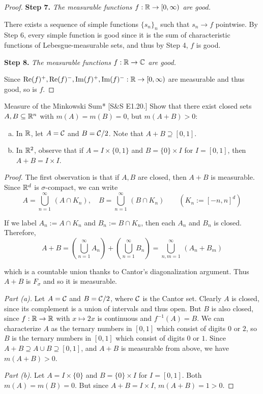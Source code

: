 \begin{proof}
    \textbf{Step 7.} \textit{The measurable functions \(f : \mathbb{R} \to [0, \infty)\) are good.}

    There exists a sequence of simple functions \(\{s_n\}_n\) such that \(s_n \to f\) pointwise. By Step 6, every simple function is good since it is the sum of characteristic functions of Lebesgue-measurable sets, and thus by Step 4, \(f\) is good. 

    \textbf{Step 8.} \textit{The measurable functions \(f : \mathbb{R} \to \mathbb{C}\) are good.}

    Since \(\Re(f)^+, \Re(f)^-, \Im(f)^+, \Im(f)^- : \mathbb{R} \to [0, \infty)\) are measurable and thus good, so is \(f\). 
\end{proof}

\begin{problem}{Measure of the Minkowski Sum}*
    [S\&S E1.20.] Show that there exist closed sets \(A,B \subseteq \mathbb{R}^n\) with \(m(A) = m(B) = 0\), but \(m(A+B) > 0\):
    \begin{enumerate}[(a)]
        \item In \(\mathbb{R}\), let \(A = \mathcal{C}\) and \(B = \mathcal{C}/2\). Note that \(A+B \supseteq [0, 1]\).
        \item In \(\mathbb{R}^2\), observe that if \(A = I \times \{0,1\}\) and \(B = \{0\} \times I\) for \(I = [0,1]\), then \(A+B = I \times I\). 
    \end{enumerate}
\end{problem}

\begin{proof}
    The first observation is that if \(A,B\) are closed, then \(A+B\) is measurable. Since \(\mathbb{R}^d\) is \(\sigma\)-compact, we can write 
    \[
    A = \bigcup_{n=1}^\infty \, (A \cap K_n), \quad B = \bigcup_{n=1}^\infty \, (B \cap K_n) \qquad (K_n := [-n, n]^d)
    \]

    If we label \(A_n := A \cap K_n\) and \(B_n := B \cap K_n\), then each \(A_n\) and \(B_n\) is closed. Therefore, 
    \[
    A + B
    = \left( \bigcup_{n=1}^\infty A_n \right) + \left( \bigcup_{n=1}^\infty B_n \right)
    = \bigcup_{n, m=1}^\infty \, (A_n + B_m)
    \]

    which is a countable union thanks to Cantor's diagonalization argument. Thus \(A+B\) is \(F_\sigma\) and so it is measurable. 

    \textit{Part (a).} Let \(A = \mathcal{C}\) and \(B = \mathcal{C} / 2\), where \(\mathcal{C}\) is the Cantor set. Clearly \(A\) is closed, since its complement is a union of intervals and thus open. But \(B\) is also closed, since \(f : \mathbb{R} \to \mathbb{R}\) with \(x \mapsto 2x\) is continuous and \(f^{-1}(A) = B\). We can characterize \(A\) as the ternary numbers in \([0,1]\) which consist of digits \(0\) or \(2\), so \(B\) is the ternary numbers in \([0,1]\) which consist of digits \(0\) or \(1\). Since \(A+B \supseteq A \cup B \supseteq [0,1]\), and \(A+B\) is measurable from above, we have \(m(A+B) > 0\). 

    \textit{Part (b).} Let \(A = I \times \{0\}\) and \(B = \{0\} \times I\) for \(I = [0,1]\). Both \(m(A) = m(B) = 0\). But since \(A+B = I \times I\), \(m(A+B) = 1 > 0\). 
\end{proof}

